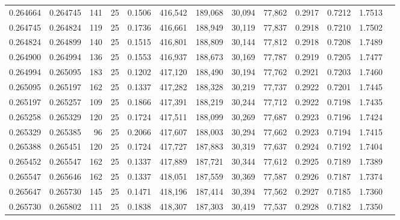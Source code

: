 \begin{tabular}{rrrrrrrrrrrrr}
0.264664 & 0.264745 &   141 &  25 &                                     0.1506 & 416,542 & 189,068 &  30,094 &  77,862 & 0.2917 & 0.7212 & 1.7513 \\
0.264745 & 0.264824 &   119 &  25 &                                     0.1736 & 416,661 & 188,949 &  30,119 &  77,837 & 0.2918 & 0.7210 & 1.7502 \\
0.264824 & 0.264899 &   140 &  25 &                                     0.1515 & 416,801 & 188,809 &  30,144 &  77,812 & 0.2918 & 0.7208 & 1.7489 \\
0.264900 & 0.264994 &   136 &  25 &                                     0.1553 & 416,937 & 188,673 &  30,169 &  77,787 & 0.2919 & 0.7205 & 1.7477 \\
0.264994 & 0.265095 &   183 &  25 &                                     0.1202 & 417,120 & 188,490 &  30,194 &  77,762 & 0.2921 & 0.7203 & 1.7460 \\
0.265095 & 0.265197 &   162 &  25 &                                     0.1337 & 417,282 & 188,328 &  30,219 &  77,737 & 0.2922 & 0.7201 & 1.7445 \\
0.265197 & 0.265257 &   109 &  25 &                                     0.1866 & 417,391 & 188,219 &  30,244 &  77,712 & 0.2922 & 0.7198 & 1.7435 \\
0.265258 & 0.265329 &   120 &  25 &                                     0.1724 & 417,511 & 188,099 &  30,269 &  77,687 & 0.2923 & 0.7196 & 1.7424 \\
0.265329 & 0.265385 &    96 &  25 &                                     0.2066 & 417,607 & 188,003 &  30,294 &  77,662 & 0.2923 & 0.7194 & 1.7415 \\
0.265388 & 0.265451 &   120 &  25 &                                     0.1724 & 417,727 & 187,883 &  30,319 &  77,637 & 0.2924 & 0.7192 & 1.7404 \\
0.265452 & 0.265547 &   162 &  25 &                                     0.1337 & 417,889 & 187,721 &  30,344 &  77,612 & 0.2925 & 0.7189 & 1.7389 \\
0.265547 & 0.265646 &   162 &  25 &                                     0.1337 & 418,051 & 187,559 &  30,369 &  77,587 & 0.2926 & 0.7187 & 1.7374 \\
0.265647 & 0.265730 &   145 &  25 &                                     0.1471 & 418,196 & 187,414 &  30,394 &  77,562 & 0.2927 & 0.7185 & 1.7360 \\
0.265730 & 0.265802 &   111 &  25 &                                     0.1838 & 418,307 & 187,303 &  30,419 &  77,537 & 0.2928 & 0.7182 & 1.7350 \\

\end{tabular}

